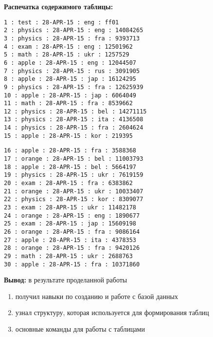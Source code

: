 \documentclass[pscyr, 12pt]{hedlab}
\begin{document}
    \noindent\textbf{Распечатка содержимого таблицы:}\\
    \begin{minipage}{0.47\textwidth}
        \begin{lstlisting}
1 : test : 28-APR-15 : eng : ff01
2 : physics : 28-APR-15 : eng : 14084265
3 : physics : 28-APR-15 : fra : 9393713
4 : exam : 28-APR-15 : eng : 12501962
5 : math : 28-APR-15 : ukr : 1257529
6 : apple : 28-APR-15 : eng : 12044507
7 : physics : 28-APR-15 : rus : 3091905
8 : apple : 28-APR-15 : jap : 16124295
9 : physics : 28-APR-15 : fra : 12625939
10 : apple : 28-APR-15 : jap : 6064049
11 : math : 28-APR-15 : fra : 8539662
12 : physics : 28-APR-15 : bel : 14271115
13 : physics : 28-APR-15 : ita : 4136508
14 : physics : 28-APR-15 : fra : 2604624
15 : apple : 28-APR-15 : kor : 219395
        \end{lstlisting}
    \end{minipage}
    \hspace*{1em}
    \begin{minipage}{0.47\textwidth}
            \begin{lstlisting}
16 : apple : 28-APR-15 : fra : 3588368
17 : orange : 28-APR-15 : bel : 11003793
18 : apple : 28-APR-15 : bel : 5664197
19 : physics : 28-APR-15 : ukr : 7619159
20 : exam : 28-APR-15 : fra : 6383862
21 : orange : 28-APR-15 : ukr : 10033407
22 : physics : 28-APR-15 : kor : 8309077
23 : exam : 28-APR-15 : ukr : 11482178
24 : orange : 28-APR-15 : eng : 1890677
25 : exam : 28-APR-15 : jap : 15609198
26 : orange : 28-APR-15 : fra : 9086164
27 : apple : 28-APR-15 : ita : 4378353
28 : orange : 28-APR-15 : fra : 9420126
29 : math : 28-APR-15 : ukr : 2688763
30 : apple : 28-APR-15 : fra : 10371860
        \end{lstlisting}
    \end{minipage}

    \noindent\textbf{Вывод:} в результате проделанной работы
    \vspace*{-1em}
    \begin{enumerate}\itemsep-5pt
        \item получил навыки по созданию и работе с базой данных
        \item узнал структуру, которая используется для формирования таблиц
        \item основные команды для работы с таблицами
    \end{enumerate}
\end{document}
